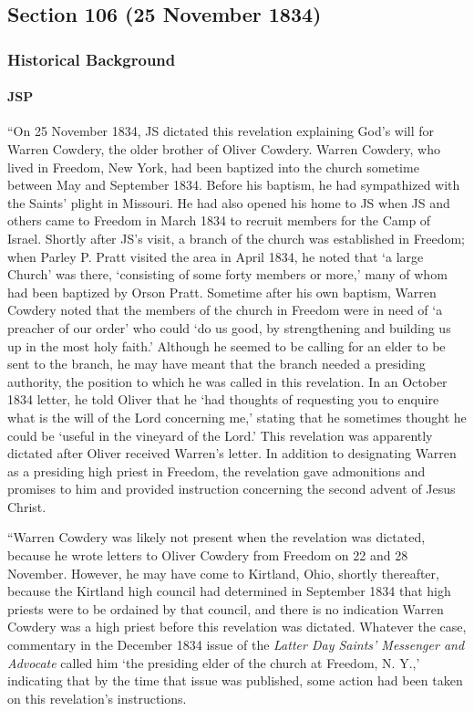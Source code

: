 \subsection{Section 106 (25 November 1834)}
	\label{DC106}
	
	\subsubsection{Historical Background}
		\label{DC106-HB}
		
		\paragraph{JSP}
		
			``On 25 November 1834, JS dictated this revelation explaining God's will for Warren Cowdery, the older brother of Oliver Cowdery. Warren Cowdery, who lived in Freedom, New York, had been baptized into the church sometime between May and September 1834. Before his baptism, he had sympathized with the Saints' plight in Missouri. He had also opened his home to JS when JS and others came to Freedom in March 1834 to recruit members for the Camp of Israel. Shortly after JS's visit, a branch of the church was established in Freedom; when Parley P. Pratt visited the area in April 1834, he noted that `a large Church' was there, `consisting of some forty members or more,' many of whom had been baptized by Orson Pratt. Sometime after his own baptism, Warren Cowdery noted that the members of the church in Freedom were in need of `a preacher of our order' who could `do us good, by strengthening and building us up in the most holy faith.' Although he seemed to be calling for an elder to be sent to the branch, he may have meant that the branch needed a presiding authority, the position to which he was called in this revelation. In an October 1834 letter, he told Oliver that he `had thoughts of requesting you to enquire what is the will of the Lord concerning me,' stating that he sometimes thought he could be `useful in the vineyard of the Lord.' This revelation was apparently dictated after Oliver received Warren's letter. In addition to designating Warren as a presiding high priest in Freedom, the revelation gave admonitions and promises to him and provided instruction concerning the second advent of Jesus Christ.
			
			``Warren Cowdery was likely not present when the revelation was dictated, because he wrote letters to Oliver Cowdery from Freedom on 22 and 28 November. However, he may have come to Kirtland, Ohio, shortly thereafter, because the Kirtland high council had determined in September 1834 that high priests were to be ordained by that council, and there is no indication Warren Cowdery was a high priest before this revelation was dictated. Whatever the case, commentary in the December 1834 issue of the \textit{Latter Day Saints' Messenger and Advocate} called him `the presiding elder of the church at Freedom, N. Y.,' indicating that by the time that issue was published, some action had been taken on this revelation's instructions.
			
